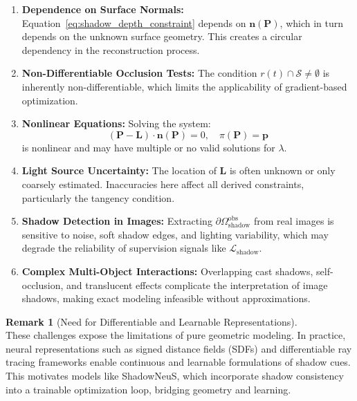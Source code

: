 \documentclass[12pt]{article}
\newcommand{\vect}[1]{\bm{#1}}
\theoremstyle{definition}
\newtheorem{remark}{Remark}[subsection]
\begin{document}
\begin{enumerate}[label=\arabic*.]
    \item \textbf{Dependence on Surface Normals:} Equation~\eqref{eq:shadow_depth_constraint} depends on $\vect{n}(\vect{P})$, which in turn depends on the unknown surface geometry. This creates a circular dependency in the reconstruction process.

    \item \textbf{Non-Differentiable Occlusion Tests:} The condition $r(t) \cap \mathcal{S} \neq \emptyset$ is inherently non-differentiable, which limits the applicability of gradient-based optimization.

    \item \textbf{Nonlinear Equations:} Solving the system:
    \[
    (\vect{P} - \vect{L}) \cdot \vect{n}(\vect{P}) = 0, \quad \pi(\vect{P}) = \vect{p}
    \]
    is nonlinear and may have multiple or no valid solutions for $\lambda$.

    \item \textbf{Light Source Uncertainty:} The location of $\vect{L}$ is often unknown or only coarsely estimated. Inaccuracies here affect all derived constraints, particularly the tangency condition.

    \item \textbf{Shadow Detection in Images:} Extracting $\partial\Omega_{\text{shadow}}^{\text{obs}}$ from real images is sensitive to noise, soft shadow edges, and lighting variability, which may degrade the reliability of supervision signals like $\mathcal{L}_{\text{shadow}}$.

    \item \textbf{Complex Multi-Object Interactions:} Overlapping cast shadows, self-occlusion, and translucent effects complicate the interpretation of image shadows, making exact modeling infeasible without approximations.
\end{enumerate}

\begin{remark}[Need for Differentiable and Learnable Representations] ~\\
These challenges expose the limitations of pure geometric modeling. In practice, neural representations such as signed distance fields (SDFs) and differentiable ray tracing frameworks enable continuous and learnable formulations of shadow cues. This motivates models like ShadowNeuS, which incorporate shadow consistency into a trainable optimization loop, bridging geometry and learning.
\end{remark}
\end{document}
